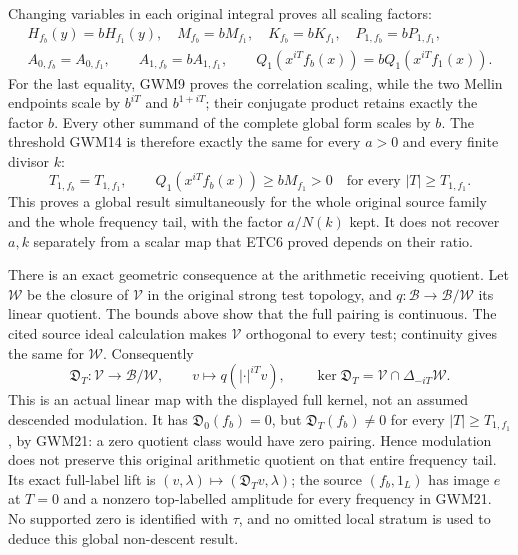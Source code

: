 Changing variables in each original integral proves all scaling factors:
\begin{equation}\tag{GWM20}
 \begin{gathered}
 H_{f_b}(y)=bH_{f_1}(y),\quad M_{f_b}=bM_{f_1},\quad
 K_{f_b}=bK_{f_1},\quad P_{1,f_b}=bP_{1,f_1},\\
 A_{0,f_b}=A_{0,f_1},\qquad A_{1,f_b}=bA_{1,f_1},\qquad
 Q_1(x^{iT}f_b(x))=bQ_1(x^{iT}f_1(x)).
 \end{gathered}
\end{equation}
For the last equality, GWM9 proves the correlation scaling, while the
two Mellin endpoints scale by $b^{iT}$ and $b^{1+iT}$; their conjugate
product retains exactly the factor $b$. Every other summand of the
complete global form scales by $b$. The threshold GWM14 is therefore
exactly the same for every $a>0$ and every finite divisor $k$:
\begin{equation}\tag{GWM21}
 T_{1,f_b}=T_{1,f_1},\qquad
 Q_1(x^{iT}f_b(x))\ge bM_{f_1}>0
 \quad\text{for every }|T|\ge T_{1,f_1}.
\end{equation}
This proves a global result simultaneously for the whole original
source family and the whole frequency tail, with the factor $a/N(k)$
kept. It does not recover $a,k$ separately from a scalar map that ETC6
proved depends on their ratio.

There is an exact geometric consequence at the arithmetic receiving
quotient. Let $\mathcal W$ be the closure of $\mathcal V$ in the original
strong test topology, and $q:\mathcal B\to\mathcal B/\mathcal W$ its
linear quotient. The bounds above show that the full pairing is
continuous. The cited source ideal calculation makes $\mathcal V$
orthogonal to every test; continuity gives the same for $\mathcal W$.
Consequently
\begin{equation}\tag{GWM22}
 \mathfrak D_T:\mathcal V\longrightarrow\mathcal B/\mathcal W,
 \qquad v\longmapsto q(|\cdot|^{iT}v),\qquad
 \ker\mathfrak D_T=\mathcal V\cap\Delta_{-iT}\mathcal W.
\end{equation}
This is an actual linear map with the displayed full kernel, not an
assumed descended modulation. It has $\mathfrak D_0(f_b)=0$, but
$\mathfrak D_T(f_b)\ne0$ for every $|T|\ge T_{1,f_1}$, by GWM21:
a zero quotient class would have zero pairing. Hence modulation
does not preserve this original arithmetic quotient on that entire
frequency tail. Its exact full-label lift is
$(v,\lambda)\mapsto(\mathfrak D_Tv,\lambda)$; the source
$(f_b,1_L)$ has image $e$ at $T=0$ and a nonzero top-labelled
amplitude for every frequency in GWM21. No supported zero is
identified with $\tau$, and no omitted local stratum is used to
deduce this global non-descent result.
